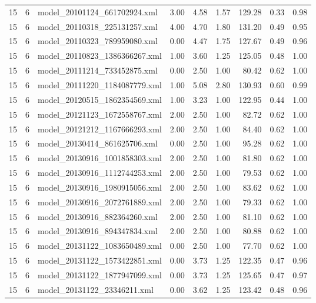 \begin{table}[ht]
\begin{tabular}{rrlrrrrrr}
   15 &   6 & model\_20101124\_661702924.xml & 3.00 & 4.58 & 1.57 & 129.28 & 0.33 & 0.98 \\ 
   15 &   6 & model\_20110318\_225131257.xml & 4.00 & 4.70 & 1.80 & 131.20 & 0.49 & 0.95 \\ 
   15 &   6 & model\_20110323\_789959080.xml & 0.00 & 4.47 & 1.75 & 127.67 & 0.49 & 0.96 \\ 
   15 &   6 & model\_20110823\_1386366267.xml & 1.00 & 3.60 & 1.25 & 125.05 & 0.48 & 1.00 \\ 
   15 &   6 & model\_20111214\_733452875.xml & 0.00 & 2.50 & 1.00 & 80.42 & 0.62 & 1.00 \\ 
   15 &   6 & model\_20111220\_1184087779.xml & 1.00 & 5.08 & 2.80 & 130.93 & 0.60 & 0.99 \\ 
   15 &   6 & model\_20120515\_1862354569.xml & 1.00 & 3.23 & 1.00 & 122.95 & 0.44 & 1.00 \\ 
   15 &   6 & model\_20121123\_1672558767.xml & 2.00 & 2.50 & 1.00 & 82.72 & 0.62 & 1.00 \\ 
   15 &   6 & model\_20121212\_1167666293.xml & 2.00 & 2.50 & 1.00 & 84.40 & 0.62 & 1.00 \\ 
   15 &   6 & model\_20130414\_861625706.xml & 0.00 & 2.50 & 1.00 & 95.28 & 0.62 & 1.00 \\ 
   15 &   6 & model\_20130916\_1001858303.xml & 2.00 & 2.50 & 1.00 & 81.80 & 0.62 & 1.00 \\ 
   15 &   6 & model\_20130916\_1112744253.xml & 2.00 & 2.50 & 1.00 & 79.53 & 0.62 & 1.00 \\ 
   15 &   6 & model\_20130916\_1980915056.xml & 2.00 & 2.50 & 1.00 & 83.62 & 0.62 & 1.00 \\ 
   15 &   6 & model\_20130916\_2072761889.xml & 2.00 & 2.50 & 1.00 & 79.33 & 0.62 & 1.00 \\ 
   15 &   6 & model\_20130916\_882364260.xml & 2.00 & 2.50 & 1.00 & 81.10 & 0.62 & 1.00 \\ 
   15 &   6 & model\_20130916\_894347834.xml & 2.00 & 2.50 & 1.00 & 80.88 & 0.62 & 1.00 \\ 
   15 &   6 & model\_20131122\_1083650489.xml & 0.00 & 2.50 & 1.00 & 77.70 & 0.62 & 1.00 \\ 
   15 &   6 & model\_20131122\_1573422851.xml & 0.00 & 3.73 & 1.25 & 122.35 & 0.47 & 0.96 \\ 
   15 &   6 & model\_20131122\_1877947099.xml & 0.00 & 3.73 & 1.25 & 125.65 & 0.47 & 0.97 \\ 
   15 &   6 & model\_20131122\_23346211.xml & 0.00 & 3.62 & 1.25 & 123.42 & 0.48 & 0.96 \\ 

\end{tabular}
\end{table}
